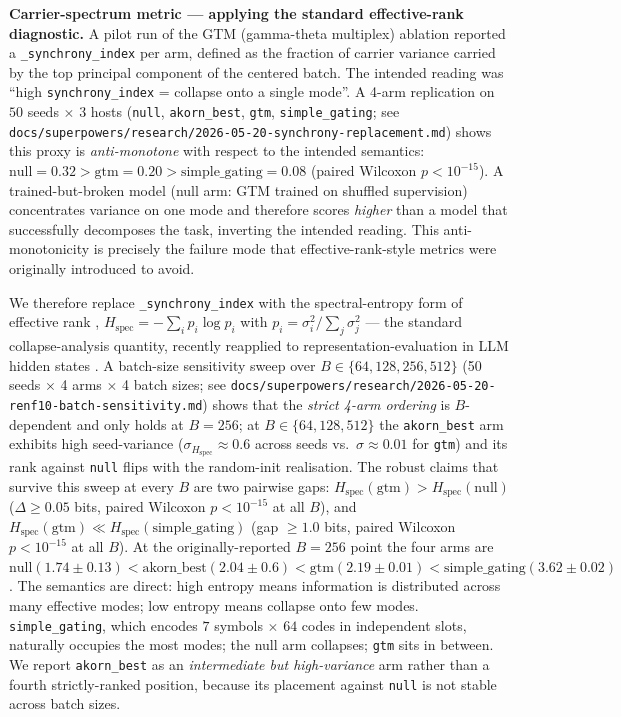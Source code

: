 \documentclass[10pt,twocolumn]{article}
\begin{document}
\textbf{Carrier-spectrum metric — applying the standard effective-rank diagnostic.}
A pilot run of the GTM (gamma-theta multiplex) ablation reported a
\texttt{\_synchrony\_index} per arm, defined as the fraction of carrier
variance carried by the top principal component of the centered batch.
The intended reading was ``high \texttt{synchrony\_index} = collapse onto a
single mode''. A 4-arm replication on $50$ seeds $\times$ $3$ hosts
(\texttt{null}, \texttt{akorn\_best}, \texttt{gtm},
\texttt{simple\_gating}; see \texttt{docs/superpowers/research/2026-05-20-synchrony-replacement.md})
shows this proxy is \emph{anti-monotone} with respect to the intended
semantics: $\text{null}{=}0.32 > \text{gtm}{=}0.20 > \text{simple\_gating}{=}0.08$
(paired Wilcoxon $p < 10^{-15}$). A trained-but-broken model
(null arm: GTM trained on shuffled supervision) concentrates variance
on one mode and therefore scores \emph{higher} than a model that
successfully decomposes the task, inverting the intended reading. This
anti-monotonicity is precisely the failure mode that effective-rank-style
metrics \cite{royvetterli2007erank} were originally introduced to avoid.

We therefore replace \texttt{\_synchrony\_index} with the spectral-entropy
form of effective rank \cite{royvetterli2007erank}, $H_{\text{spec}} =
-\sum_i p_i \log p_i$ with $p_i = \sigma_i^2 / \sum_j \sigma_j^2$ ---
the standard collapse-analysis quantity, recently reapplied to
representation-evaluation in LLM hidden states \cite{wei2024differank}.
A batch-size sensitivity sweep over $B \in \{64, 128, 256, 512\}$
(50 seeds $\times$ 4 arms $\times$ 4 batch sizes; see
\texttt{docs/superpowers/research/2026-05-20-renf10-batch-sensitivity.md})
shows that the \emph{strict 4-arm ordering} is $B$-dependent and only
holds at $B = 256$; at $B \in \{64, 128, 512\}$ the
\texttt{akorn\_best} arm exhibits high seed-variance
($\sigma_{H_{\text{spec}}} \approx 0.6$ across seeds vs.\
$\sigma \approx 0.01$ for \texttt{gtm}) and its rank against
\texttt{null} flips with the random-init realisation. The robust
claims that survive this sweep at every $B$ are two pairwise
gaps: $H_{\text{spec}}(\text{gtm}) > H_{\text{spec}}(\text{null})$
($\Delta \geq 0.05$ bits, paired Wilcoxon $p < 10^{-15}$ at all $B$),
and $H_{\text{spec}}(\text{gtm}) \ll H_{\text{spec}}(\text{simple\_gating})$
(gap $\geq 1.0$ bits, paired Wilcoxon $p < 10^{-15}$ at all $B$).
At the originally-reported $B = 256$ point the four arms are
$\text{null} (1.74 \pm 0.13) <
 \text{akorn\_best} (2.04 \pm 0.6) <
 \text{gtm} (2.19 \pm 0.01) <
 \text{simple\_gating} (3.62 \pm 0.02)$.
The semantics are direct: high entropy means information is distributed
across many effective modes; low entropy means collapse onto few modes.
\texttt{simple\_gating}, which encodes $7$ symbols $\times$ $64$ codes in
independent slots, naturally occupies the most modes; the null arm
collapses; \texttt{gtm} sits in between. We report \texttt{akorn\_best}
as an \emph{intermediate but high-variance} arm rather than a fourth
strictly-ranked position, because its placement against \texttt{null}
is not stable across batch sizes.
\end{document}

